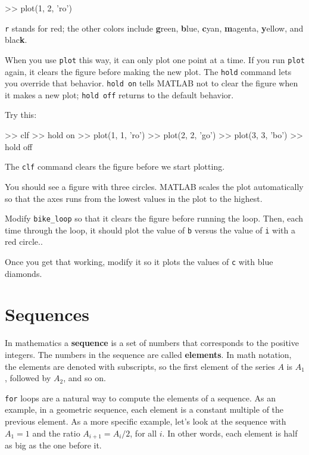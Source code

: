 \begin{code}
>> plot(1, 2, 'ro')
\end{code}

{\tt r} stands for red; the other colors include {\bf g}reen, {\bf
b}lue, {\bf c}yan, {\bf m}agenta, {\bf y}ellow, and blac{\bf k}.

When you use {\tt plot} this way, it can only plot one point at a
time.  If you run {\tt plot} again, it clears the figure before making
the new plot.  The {\tt hold} command lets you override that behavior.
{\tt hold on} tells MATLAB not to clear the figure when it makes a new
plot; {\tt hold off} returns to the default behavior.


Try this:

\begin{code}
>> clf
>> hold on
>> plot(1, 1, 'ro')
>> plot(2, 2, 'go')
>> plot(3, 3, 'bo')
>> hold off
\end{code}

The {\tt clf} command clears the figure before we start plotting.


You should see a figure with three circles.  MATLAB scales the plot automatically so that the axes runs from the lowest values in the plot to the highest.

\begin{ex}
Modify \verb"bike_loop" so that it clears the figure before running the loop.  Then, each time through the
loop, it should plot the value of {\tt b} versus the value of {\tt i} with a red circle..

Once you get that working, modify it so it plots the values of {\tt c} with blue diamonds.
\end{ex}


\section{Sequences}

In mathematics a {\bf sequence} is a set of numbers that corresponds
to the positive integers.  The numbers in the sequence are
called {\bf elements}.  In math notation, the elements
are denoted with subscripts, so the first element of the series $A$ is
$A_1$, followed by $A_2$, and so on.


{\tt for} loops are a natural way to compute the elements of a sequence.
As an example, in a geometric sequence, each element is a constant
multiple of the previous element.  As a more specific example, let's
look at the sequence with $A_1 = 1$ and the ratio $A_{i+1} = A_i/2$,
for all $i$.  In other words, each element is half as big as the one
before it.

